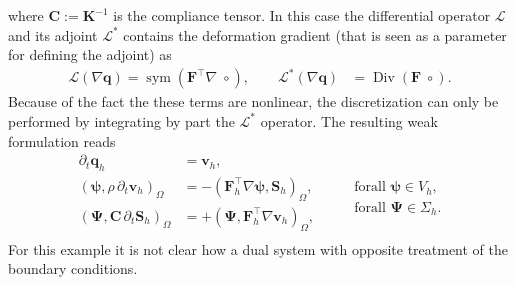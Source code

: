 \documentclass[11pt,a4paper]{article}
\DeclareMathOperator*{\Div}{Div}
\DeclareMathOperator*{\sym}{sym}
\newcommand{\innerproduct}[3][\Omega]{(#2, #3)_{#1}}
\begin{document}
{\begin{equation*}
\end{equation*}
where $\bm{C}:=\bm{K}^{-1}$ is the compliance tensor. In this case the  differential operator $\mathcal{L}$ and its adjoint $\mathcal{L}^*$ contains the deformation gradient (that is seen as a parameter for defining the adjoint) as
$$
\begin{aligned}
    \mathcal{L}(\nabla \bm{q}) = \sym( \bm{F}^\top \nabla \; \circ), \qquad
\mathcal{L}^*(\nabla \bm{q}) & =  \Div (\bm{F} \; \circ).
\end{aligned}
$$
Because of the fact the these terms are nonlinear, the discretization can only be performed by integrating by part the $\mathcal{L}^*$ operator. The resulting weak formulation reads
\begin{equation*}
\begin{aligned}
    \partial_t \bm{q}_h &= \bm{v}_h, \\
    \innerproduct[\Omega]{\bm{\psi}}{\rho\,\partial_t \bm{v}_h} &= - \innerproduct[\Omega]{\bm{F}_h^\top\nabla\bm{\psi}}{\bm{S}_h},  \\
    \innerproduct[\Omega]{\bm{\Psi}}{\bm{C}\,\partial_t \bm{S}_h} &= +\innerproduct[\Omega]{\bm{\Psi}}{\bm{F}_h^\top\nabla\bm{v}_h},  \\
\end{aligned} \qquad 
\begin{aligned}
\\
\text{forall } \bm{\psi} \in V_h, \\
\text{forall } \bm{\Psi} \in \Sigma_h.
\end{aligned}
\end{equation*}
For this example it is not clear how a dual system with opposite treatment of the boundary conditions.
}
\end{document}
